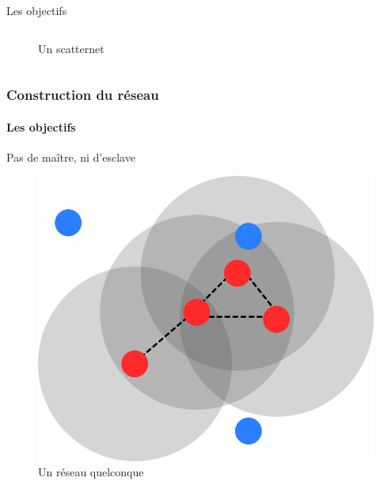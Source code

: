 \documentclass{beamer}
\begin{document}
\begin{frame}
\begin{small}
\begin{block}{Les objectifs}
\begin{columns}
\begin{column}{.5\textwidth}
\begin{figure}
\begin{center}
                  \label{fig:scatternet}
                  \caption{Un scatternet}
                \end{center}
              \end{figure}
            \end{column}
          \end{columns}
        \end{block}
      \end{small}
    \end{frame}
    \begin{frame}
      \frametitle{Construction du réseau}
      \framesubtitle{Les objectifs}
      \begin{block}{Pas de maître, ni d'esclave}
        \begin{figure}
          \begin{center}
            \includegraphics[width=.4\textwidth]{images/reseau_quelconque.png}
            \caption{Un réseau quelconque}
            \label{fig:quelconque}
          \end{center}
        \end{figure}
      \end{block}
    \end{frame}
\end{document}
